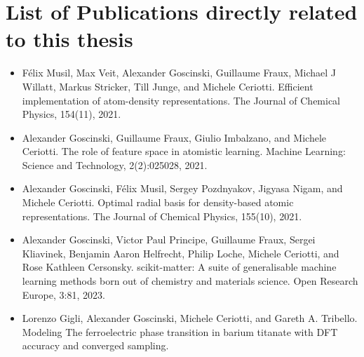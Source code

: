 \newpage
\section*{List of Publications directly related to this thesis}
\begin{itemize}
  \item Félix Musil, Max Veit, Alexander Goscinski, Guillaume Fraux, Michael J Willatt, Markus Stricker, Till Junge, and Michele Ceriotti. Efficient implementation of atom-density representations. The Journal of Chemical Physics, 154(11), 2021.
  \item Alexander Goscinski, Guillaume Fraux, Giulio Imbalzano, and Michele Ceriotti. The role of feature space in atomistic learning. Machine Learning: Science and Technology, 2(2):025028, 2021.
  \item Alexander Goscinski, Félix Musil, Sergey Pozdnyakov, Jigyasa Nigam, and Michele Ceriotti. Optimal radial basis for density-based atomic representations. The Journal of Chemical Physics, 155(10), 2021.
  \item Alexander Goscinski, Victor Paul Principe, Guillaume Fraux, Sergei Kliavinek, Benjamin Aaron Helfrecht, Philip Loche, Michele Ceriotti, and Rose Kathleen Cersonsky. scikit-matter: A suite of generalisable machine learning methods born out of chemistry and materials science. Open Research Europe, 3:81, 2023.
  \item Lorenzo Gigli, Alexander Goscinski, Michele Ceriotti, and Gareth A. Tribello. Modeling The ferroelectric phase transition in barium titanate with DFT accuracy and converged sampling.
\end{itemize}

